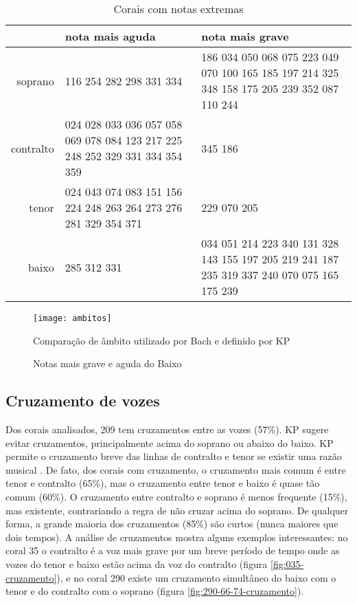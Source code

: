 \begin{table}
\begin{center}
\begin{small}
\begin{sc}
  \begin{tabular}{r|p{4cm}p{4cm}}
    & nota mais aguda & nota mais grave \\ 
    \hline
    soprano &  116 254 282 298 331 334 &  186 034 050 068 075 223 049 070 100 165 185 197 214 325 348 158 175
    205 239 352 087 110 244 \\ \aroundspace
    contralto & 024 028 033 036 057 058 069 078 084 123 217 225 248 252 329 331 334
    354 359 &   345 186 \\ \aroundspace
    tenor &   024 043 074 083 151 156 224 248 263 264 273 276 281 329
    354 371 &   229 070 205 \\ \aroundspace
    baixo &   285 312 331 &   034 051 214 223 340 131 328 143 155 197 205 219 241 187 235 319 337
    240 070 075 165 175 239 
  \end{tabular}
  \caption{Corais com notas extremas}
  \label{tab:notas-extremas}
\end{sc}
\end{small}
\end{center}
\end{table}

\begin{figure}[!h]
  \centering
  \texttt{[image: ambitos]}
  \caption{Comparação de âmbito utilizado por Bach e definido por KP}
  \label{fig:ambito-kostka}
\end{figure}

\begin{figure}[!h]
  \centering
  \caption{Notas mais grave e aguda do Baixo}
  \label{fig:ambitos-alem}
\end{figure}

\subsection{Cruzamento de vozes}
\label{sec:cruzamento-de-vozes}

Dos corais analisados, 209 tem cruzamentos entre as vozes (57\%). KP
sugere evitar cruzamentos, principalmente acima do soprano ou abaixo
do baixo. KP permite o cruzamento breve das linhas de contralto e
tenor se existir uma razão musical \cite[p. 79]{kostka.ea00:tonal}. De
fato, dos corais com cruzamento, o cruzamento mais comum é entre tenor
e contralto (65\%), mas o cruzamento entre tenor e baixo é quase tão
comum (60\%). O cruzamento entre contralto e soprano é menos frequente
(15\%), mas existente, contrariando a regra de não cruzar acima do
soprano. De qualquer forma, a grande maioria dos cruzamentos (85\%)
são curtos (nunca maiores que dois tempos). A análise de cruzamentos
mostra alguns exemplos interessantes: no coral 35 o contralto é a voz
mais grave por um breve período de tempo onde as vozes do tenor e
baixo estão acima da voz do contralto (figura
\ref{fig:035-cruzamento}), e no coral 290 existe um cruzamento
simultâneo do baixo com o tenor e do contralto com o soprano (figura
\ref{fig:290-66-74-cruzamento}).

